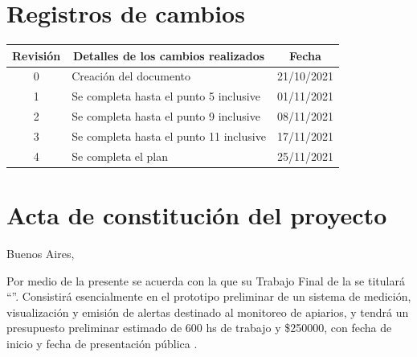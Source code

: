 \documentclass[
11pt, %
codirector, %
]{charter}
\begin{document}
\maketitle
\thispagestyle{empty}
\pagebreak


\thispagestyle{empty}
{\setlength{\parskip}{0pt}
\tableofcontents{}
}
\pagebreak


\section*{Registros de cambios}
\label{sec:registro}


\begin{table}[ht]
\label{tab:registro}
\centering
\begin{tabularx}{\linewidth}{@{}|c|X|c|@{}}
\hline
\rowcolor[HTML]{C0C0C0} 
Revisión & \multicolumn{1}{c|}{\cellcolor[HTML]{C0C0C0}Detalles de los cambios realizados} & Fecha      \\ \hline
0      & Creación del documento                                 & 21/10/2021 \\ \hline
1      & Se completa hasta el punto 5 inclusive                 & 01/11/2021 \\ \hline
2      & Se completa hasta el punto 9 inclusive                 & 08/11/2021 \\ \hline
3      & Se completa hasta el punto 11 inclusive                 & 17/11/2021 \\ \hline
4      & Se completa el plan & 25/11/2021 \\ \hline
\end{tabularx}
\end{table}

\pagebreak



\section*{Acta de constitución del proyecto}
\label{sec:acta}

\begin{flushright}
Buenos Aires, \fechaInicioName
\end{flushright}

\vspace{2cm}

Por medio de la presente se acuerda con la \authorname\hspace{1px} que su Trabajo Final de la \degreename\hspace{1px} se titulará ``\ttitle''. Consistirá esencialmente en el prototipo preliminar de un sistema de medición, visualización y emisión de alertas destinado al monitoreo de apiarios, y tendrá un presupuesto preliminar estimado de 600 hs de trabajo y {\$250000}, con fecha de inicio \fechaInicioName\hspace{1px} y fecha de presentación pública \fechaFinalName.
\end{document}

